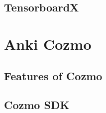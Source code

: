 \subsection{TensorboardX}



\section{Anki Cozmo}



\subsection{Features of Cozmo}



\subsection{Cozmo SDK}



